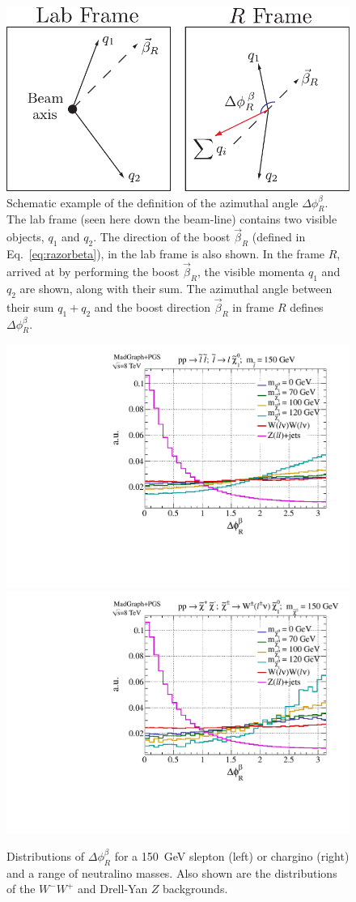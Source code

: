 \begin{figure}[ht]
\includegraphics[width=0.7\columnwidth]{fig/sectionII/deltaphi.pdf}
\caption{Schematic example of the definition of the azimuthal angle $\Delta\phi_R^{\beta}$. The lab frame (seen here down the beam-line) contains two visible objects, $q_1$ and $q_2$. The direction of the boost $\vec{\beta}_R$ (defined in Eq.~\eqref{eq:razorbeta}), in the lab frame is also shown. In the frame $R$, arrived at by performing the boost $\vec{\beta}_R$, the visible momenta $q_1$ and $q_2$ are shown, along with their sum. The azimuthal angle between their sum $q_1+q_2$ and the boost direction $\vec{\beta}_R$ in frame $R$ defines $\Delta \phi_R^{\beta}$. \label{fig:deltaphi}}
\end{figure}

\begin{figure}[ht]
\includegraphics[width=0.45\columnwidth]{fig/sectionII/dphi_slepton.pdf}
\includegraphics[width=0.45\columnwidth]{fig/sectionII/dphi_chargino.pdf}
\caption{Distributions of $\Delta\phi_R^\beta$ for a 150~GeV slepton (left) or chargino (right) and a range of neutralino masses. Also shown are the distributions of the $W^-W^+$ and Drell-Yan $Z$ backgrounds.  \label{fig:deltaRbeta}}
\end{figure}

